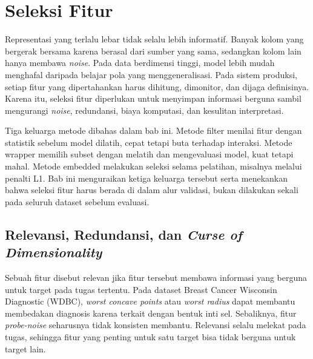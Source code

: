\chapter{Seleksi Fitur}\label{seleksi-fitur}

Representasi yang terlalu lebar tidak selalu lebih informatif. Banyak kolom yang bergerak bersama karena berasal dari sumber yang sama, sedangkan kolom lain hanya membawa \emph{noise}. Pada data berdimensi tinggi, model lebih mudah menghafal daripada belajar pola yang menggeneralisasi. Pada sistem produksi, setiap fitur yang dipertahankan harus dihitung, dimonitor, dan dijaga definisinya. Karena itu, seleksi fitur diperlukan untuk menyimpan informasi berguna sambil mengurangi \emph{noise}, redundansi, biaya komputasi, dan kesulitan interpretasi.

Tiga keluarga metode dibahas dalam bab ini. Metode filter menilai fitur dengan statistik sebelum model dilatih, cepat tetapi buta terhadap interaksi. Metode wrapper memilih subset dengan melatih dan mengevaluasi model, kuat tetapi mahal. Metode embedded melakukan seleksi selama pelatihan, misalnya melalui penalti L1. Bab ini menguraikan ketiga keluarga tersebut serta menekankan bahwa seleksi fitur harus berada di dalam alur validasi, bukan dilakukan sekali pada seluruh dataset sebelum evaluasi.

\section{\texorpdfstring{Relevansi, Redundansi, dan \emph{Curse of Dimensionality}}{Relevansi, Redundansi, dan Curse of Dimensionality}}\label{relevansi-redundansi-dan-curse-of-dimensionality}

Sebuah fitur disebut relevan jika fitur tersebut membawa informasi yang berguna untuk target pada tugas tertentu. Pada dataset Breast Cancer Wisconsin Diagnostic (WDBC), \emph{worst concave points} atau \emph{worst radius} dapat membantu membedakan diagnosis karena terkait dengan bentuk inti sel. Sebaliknya, fitur \emph{probe-noise} seharusnya tidak konsisten membantu. Relevansi selalu melekat pada tugas, sehingga fitur yang penting untuk satu target bisa tidak berguna untuk target lain.


